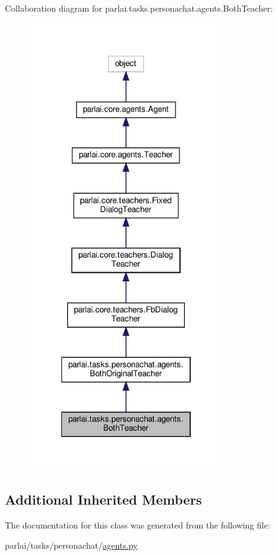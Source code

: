 Collaboration diagram for parlai.\+tasks.\+personachat.\+agents.\+Both\+Teacher\+:
\nopagebreak
\begin{figure}[H]
\begin{center}
\leavevmode
\includegraphics[width=238pt]{classparlai_1_1tasks_1_1personachat_1_1agents_1_1BothTeacher__coll__graph}
\end{center}
\end{figure}
\subsection*{Additional Inherited Members}


The documentation for this class was generated from the following file\+:\begin{DoxyCompactItemize}
\item 
parlai/tasks/personachat/\hyperlink{parlai_2tasks_2personachat_2agents_8py}{agents.\+py}\end{DoxyCompactItemize}
